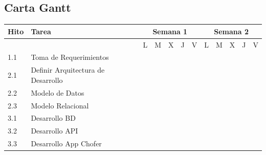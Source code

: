 \documentclass[12pt]{article}
\begin{document}
\subsection{Carta Gantt}
\begin{table}[!h]
\centering
\begin{tabular}{|p{1.5cm}|p{7cm}|*{10}{c|}}
\hline
\textbf{Hito} & \textbf{Tarea} & \multicolumn{5}{c|}{\textbf{Semana 1}} & \multicolumn{5}{c|}{\textbf{Semana 2}} \\
\hline
 & & L & M & X & J & V & L & M & X & J & V \\
\hline
1.1 & Toma de Requerimientos & \cellcolor{gray} & & & & & & & & & \\
\hline
2.1 & Definir Arquitectura de Desarrollo & & \cellcolor{gray} & & & & & & & & \\
\hline
2.2 & Modelo de Datos & & & \cellcolor{gray} & & & & & & & \\
\hline
2.3 & Modelo Relacional & & & & \cellcolor{gray} & & & & & & \\
\hline
3.1 & Desarrollo BD & & & & & \cellcolor{gray} & \cellcolor{gray} & & & & \\
\hline
3.2 & Desarrollo API & & & & & & \cellcolor{gray} & \cellcolor{gray} & \cellcolor{gray} & \cellcolor{gray} & \\
\hline
3.3 & Desarrollo App Chofer & & & & & & & & & & \cellcolor{gray} \\
\hline
\end{tabular}
\end{table}
\end{document}
